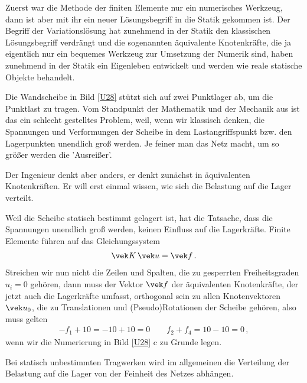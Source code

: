 {%

Zuerst war die Methode der finiten Elemente nur ein numerisches Werkzeug, dann ist aber mit ihr ein neuer L\"{o}sungsbegriff in die Statik gekommen ist. Der Begriff der Variationsl\"{o}sung hat zunehmend in der Statik den klassischen L\"{o}sungsbegriff verdr\"{a}ngt und die sogenannten \"{a}quivalente Knotenkr\"{a}fte, die ja eigentlich nur ein bequemes Werkzeug  zur Umsetzung der Numerik sind, haben zunehmend in der Statik ein Eigenleben entwickelt und werden wie reale statische Objekte behandelt.

Die Wandscheibe in Bild \ref{U28} st\"{u}tzt sich auf zwei Punktlager ab, um die Punktlast zu tragen. Vom Standpunkt der Mathematik und der Mechanik aus ist das ein schlecht gestelltes Problem, weil, wenn wir klassisch denken, die Spannungen und Verformungen der Scheibe in dem Lastangriffspunkt bzw. den Lagerpunkten unendlich gro{\ss} werden. Je feiner man das Netz macht, um so gr\"{o}{\ss}er werden die 'Ausrei{\ss}er'.

Der Ingenieur denkt aber anders, er denkt zun\"{a}chst in \"{a}quivalenten Knotenkr\"{a}ften. Er will erst einmal wissen, wie sich die Belastung auf die Lager verteilt.

Weil die Scheibe statisch bestimmt gelagert ist, hat die Tatsache, dass die Spannungen unendlich gro{\ss} werden, keinen Einfluss auf die Lagerkr\"{a}fte.
Finite Elemente f\"{u}hren auf das Gleichungssystem
\begin{align}
\vek K\,\vek  u = \vek f\,.
\end{align}
Streichen wir nun nicht die Zeilen und Spalten, die zu gesperrten Freiheitsgraden $u_i = 0$ geh\"{o}ren, dann muss der Vektor $\vek f$ der \"{a}quivalenten Knotenkr\"{a}fte, der jetzt auch die Lagerkr\"{a}fte umfasst, orthogonal sein zu allen Knotenvektoren $\vek u_0$, die zu Translationen und (Pseudo)Rotationen der Scheibe geh\"{o}ren, also muss gelten
\begin{align}
- f_1 + 10 = - 10 + 10 = 0 \qquad f_2 + f_4 = 10 - 10 = 0\,,
\end{align}
wenn wir die Numerierung in Bild \ref{U28} c zu Grunde legen.

Bei statisch unbestimmten Tragwerken wird im allgemeinen die Verteilung der Belastung auf die Lager von der Feinheit des Netzes abh\"{a}ngen.


}
